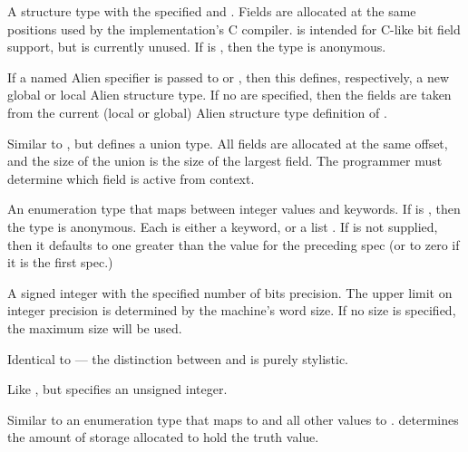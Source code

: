 {

A structure type with the specified  and .  Fields are
allocated at the same positions used by the implementation's C compiler.
 is intended for C-like bit field support, but is currently unused.
If  is \false, then the type is anonymous.

If a named Alien  specifier is passed to 
or , then this defines, respectively, a new global or local
Alien structure type.  If no  are specified, then the fields are
taken from the current (local or global) Alien structure type definition of
.
\enddeftp

Similar to , but defines a union type.  All fields are allocated at
the same offset, and the size of the union is the size of the largest field.
The programmer must determine which field is active from context.
\enddeftp

An enumeration type that maps between integer values and keywords.  If
 is \false, then the type is anonymous.  Each  is either
a keyword, or a list .  If  is
not supplied, then it defaults to one greater than the value for the preceding
spec (or to zero if it is the first spec.)
\enddeftp

A signed integer with the specified number of bits precision.  The upper limit
on integer precision is determined by the machine's word size.  If no size is
specified, the maximum size will be used.
\enddeftp

Identical to  --- the distinction between  and
 is purely stylistic.
\enddeftp

Like , but specifies an unsigned integer.
\enddeftp

Similar to an enumeration type that maps  to \false{} and all other values
to \true.   determines the amount of storage allocated to hold the
truth value.
\enddeftp

}
